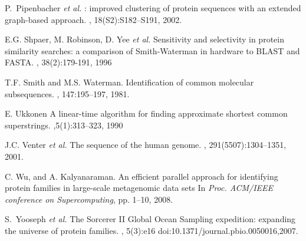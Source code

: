 \documentclass[10pt,journal,letterpaper,compsoc]{IEEEtran}
\begin{document}
\begin{thebibliography}{1}
P.~Pipenbacher {\it et al.}
: improved clustering of protein sequences with an extended graph-based approach.
, 18(S2):S182--S191, 2002.


E.G. Shpaer, M. Robinson, D. Yee {\it et al.}
\newblock Sensitivity and selectivity in protein similarity searches: a comparison of Smith-Waterman in hardware to BLAST and FASTA.
, 38(2):179-191, 1996

T.F. Smith and M.S. Waterman.
\newblock Identification of common molecular subsequences.
, 147:195--197, 1981.

E. Ukkonen
\newblock A linear-time algorithm for finding approximate shortest common superstrings.
,5(1):313--323, 1990

J.C. Venter {\it et al.}
\newblock The sequence of the human genome.
, 291(5507):1304--1351, 2001.


C. Wu, and A. Kalyanaraman.
\newblock An efficient parallel approach for identifying protein families in large-scale metagenomic data sets
\newblock In {\em Proc. ACM/IEEE conference on Supercomputing}, pp. 1--10, 2008.


S.~Yooseph {\it et al.}
\newblock The Sorcerer II Global Ocean Sampling expedition: expanding the universe of protein families.
, 5(3):e16 doi:10.1371/journal.pbio.0050016,2007.


\end{thebibliography}




\end{document}
